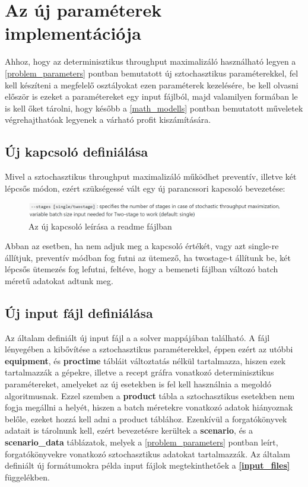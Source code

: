\section{Az új paraméterek implementációja}
Ahhoz, hogy az determinisztikus throughput maximalizáló használható legyen a \ref{problem_parameters} pontban bemutatott új sztochasztikus paraméterekkel, fel kell készíteni a megfelelő osztályokat ezen paraméterek kezelésére, be kell olvasni először is ezeket a paramétereket egy input fájlból, majd valamilyen formában le is kell őket tárolni, hogy később a \ref{math_modells} pontban bemutatott műveletek végrehajthatóak legyenek a várható profit kiszámítására.
\subsection{Új kapcsoló definiálása}
Mivel a sztochasztikus throughput maximalizáló működhet preventív, illetve két lépcsős módon, ezért szükségessé vált egy új parancssori kapcsoló bevezetése:
\begin{figure}[H]
\begin{center}
\includegraphics[scale=0.4]{switch}
\caption{Az új kapcsoló leírása a readme fájlban}
\label{switch}
\end{center}
\end{figure}
Abban az esetben, ha nem adjuk meg a kapcsoló értékét, vagy azt single-re állítjuk, preventív módban fog futni az ütemező, ha twostage-t állítunk be, két lépcsős ütemezés fog lefutni, feltéve, hogy a bemeneti fájlban változó batch méretű adatokat adtunk meg.
\subsection{Új input fájl definiálása}
Az általam definiált új input fájl a  a solver  mappájában található.
A fájl lényegében a  kibővítése a sztochasztikus paraméterekkel, éppen ezért az utóbbi \textbf{equipment}, és \textbf{proctime} tábláit változtatás nélkül tartalmazza, hiszen ezek tartalmazzák a gépekre, illetve a recept gráfra vonatkozó determinisztikus paramétereket, amelyeket az új esetekben is fel kell használnia a megoldó algoritmusnak.
Ezzel szemben a \textbf{product} tábla a sztochasztikus esetekben nem fogja megállni a helyét, hiszen a batch méretekre vonatkozó adatok hiányoznak belőle, ezeket hozzá kell adni a product táblához.
Ezenkívül a forgatókönyvek adatait is tárolnunk kell, ezért bevezetésre kerültek a\textbf{ scenario}, és a \textbf{scenario\_data} táblázatok, melyek a \ref{problem_parameters} pontban leírt, forgatókönyvekre vonatkozó sztochasztikus adatokat tartalmazzák.
Az általam definiált új formátumokra példa input fájlok megtekinthetőek a \textbf{\ref{input_files}} függelékben.
